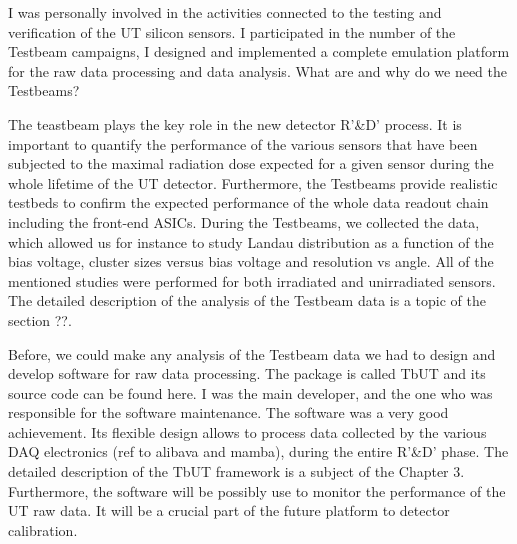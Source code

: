I was personally involved in the activities connected to the testing and verification of the UT silicon sensors. I participated in the number of the Testbeam campaigns, I designed and implemented a complete emulation platform for the raw data processing and data analysis. What are and why do we need the Testbeams? 

The teastbeam plays the key role in the new detector R'\&D' process. It is important to quantify the performance of the various sensors that have been subjected to the maximal radiation dose expected for a given sensor during the whole lifetime of the UT detector. Furthermore, the Testbeams provide realistic testbeds to confirm the expected performance of the whole data readout chain including the front-end ASICs. During the Testbeams, we collected the data, which allowed us for instance to study Landau distribution as a function of the bias voltage, cluster sizes versus bias voltage and resolution vs angle. All of the mentioned studies were performed for both irradiated and unirradiated sensors. The detailed description of the analysis of the Testbeam data is a topic of the section ??.

Before, we could make any analysis of the Testbeam data we had to design and develop software for raw data processing. The package is called TbUT and its source code can be found here. I was the main developer, and the one who was responsible for the software maintenance. The software was a very good achievement. Its flexible design allows to process data collected by the various DAQ electronics (ref to alibava and mamba), during the entire R'\&D' phase. The detailed description of the TbUT framework is a subject of the Chapter 3. Furthermore, the software will be possibly use to monitor the performance of the UT raw data. It will be a crucial part of the future platform to detector calibration. 


